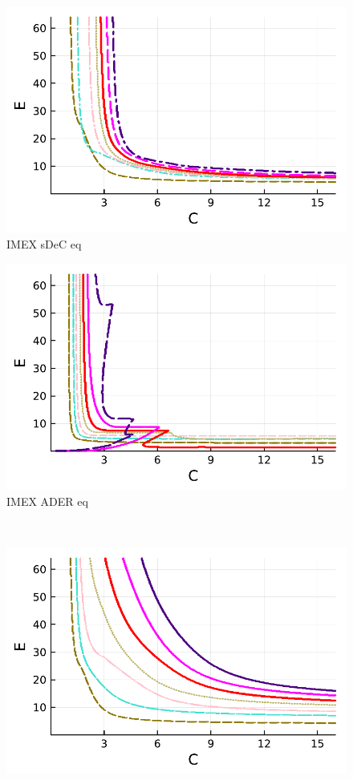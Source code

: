 \begin{figure}
\begin{minipage}[t]{0.32\textwidth}
		\includegraphics[width=\textwidth]{pdf/pdepics/diff/IMEXDeC_subtimesteps_equispaced_TMM_ord_2-8.pdf}
		\centering
		IMEX sDeC eq
	\end{minipage}
	\begin{minipage}[t]{0.32\textwidth}
		\includegraphics[width=\textwidth]{pdf/pdepics/diff/IMEXADER_equispaced_TMM_ord_2-8.pdf}
		\centering
		IMEX ADER eq
	\end{minipage} \\
	\begin{minipage}[t]{0.32\textwidth}
		\includegraphics[width=\textwidth]{pdf/pdepics/diff/IMEXDeC_gaussLobatto_TMM_ord_2-8.pdf}

\end{minipage}
\end{figure}
